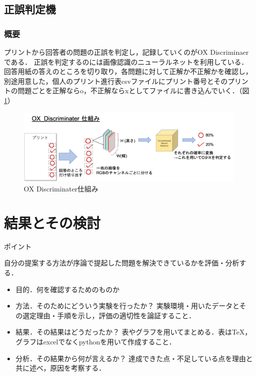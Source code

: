 \documentclass[a4j,11pt,report]{jsbook}
\newcommand{\point}[1]{
\begin{itembox}[l]{ポイント}
  #1
\end{itembox}
}
\begin{document}
\clearpage
\section{正誤判定機}
\subsection{概要}
プリントから回答者の問題の正誤を判定し，記録していくのがOX Discriminaerである．
正誤を判定するのには画像認識のニューラルネットを利用している．回答用紙の答えのところを切り取り，各問題に対して正解か不正解かを確認し，別途用意した，個人のプリント進行表csvファイルにプリント番号とそのプリントの問題ごとを正解ならo，不正解ならxとしてファイルに書き込んでいく．（図\ref{fig:Discriminater_simple}）

\begin{center}
  \begin{figure}[htb]
    \centering
    \includegraphics[width=\linewidth]{image/OX_Discriminater.png}
    \caption{OX Discriminater仕組み}
    \label{fig:Discriminater_simple}
  \end{figure}
\end{center}





\chapter{結果とその検討 \label{ch:result}}
\point{
自分の提案する方法が序論で提起した問題を解決できているかを評価・分析する．
\begin{itemize}
  \item 目的．何を確認するためのものか
  \item 方法．そのためにどういう実験を行ったか？ 実験環境・用いたデータとその選定理由・手順を示し，評価の適切性を論証すること．
  \item 結果．その結果はどうだったか？ 表やグラフを用いてまとめる．表はTeX，グラフはexcelでなくpythonを用いて作成すること．
  \item 分析．その結果から何が言えるか？ 達成できた点・不足している点を理由と共に述べ，原因を考察する．
\end{itemize}
}
\fi
\end{document}
